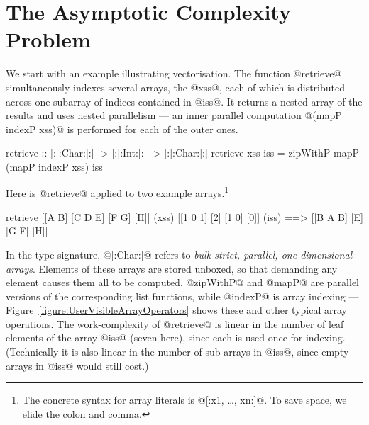 \clearpage{}
\section{The Asymptotic Complexity Problem}
\label{section:goal}
\label{section:problem}

We start with an example illustrating vectorisation.  The function @retrieve@ simultaneously indexes several arrays, the @xss@, each of which is distributed across one subarray of indices contained in @iss@. It returns a nested array of the results and uses nested parallelism --- an inner parallel computation @(mapP indexP xss)@ is performed for each of the outer ones.
\par
\begin{small}
\begin{code}
 retrieve :: [:[:Char:]:] -> [:[:Int:]:] -> [:[:Char:]:]
 retrieve xss iss
   = zipWithP mapP (mapP indexP xss) iss
\end{code}
\end{small}
\par
\noindent
Here is @retrieve@ applied to two example arrays.\footnote{The concrete syntax for array literals is @[:x1, \ldots, xn:]@. To save space, we elide the colon and comma.}
\par
\begin{small}
\begin{code}
 retrieve [[A B]   [C D E] [F G] [H]]       (xss)
          [[1 0 1] [2]     [1 0] [0]]       (iss)
     ==>  [[B A B] [E]     [G F] [H]]
\end{code}
\end{small}
%
In the type signature, @[:Char:]@ refers to \emph{bulk-strict, parallel, one-dimensional arrays}.  Elements of these arrays are stored unboxed, so that demanding any element causes them all to be computed.  @zipWithP@ and @mapP@ are parallel versions of the corresponding list functions, while @indexP@ is array indexing --- Figure~\ref{figure:UserVisibleArrayOperators} shows these and other typical array operations. The work-complexity of @retrieve@ is linear in the number of leaf elements of the array @iss@ (seven here), since each is used once for indexing.  (Technically it is also linear in the number of sub-arrays in @iss@, since empty arrays in @iss@ would still cost.)

